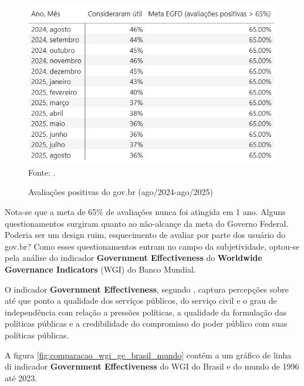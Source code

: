 \begin{figure}[H]
	\centering
	\caption{Avaliações positivas do gov.br (ago/2024-ago/2025)}
	\includegraphics[width=1\linewidth]{figuras/avaliacoes_poitivas_govbr}
	\label{fig:avaliacoes_poitivas_govbr}
	\footnotesize{Fonte: \cite{painel_completo_monitoramento_govbr}.}
\end{figure}

Nota-se que a meta de 65\% de avaliações nunca foi atingida em 1 ano. Alguns questionamentos surgiram quanto ao não-alcançe da meta do Governo Federal. Poderia ser um design ruim, esquecimento de avaliar por parte dos usuário do gov.br? Como esses questionamentos entram no campo da subjetividade, optou-se pela análise do indicador \textbf{Government Effectiveness} do \textbf{Worldwide Governance Indicators} (WGI) do Banco Mundial.

O indicador \textbf{Government Effectiveness}, segundo \cite{kaufmann2024worldwide}, captura percepções sobre até que ponto a qualidade dos serviços públicos, do serviço civil e o grau de independência com relação a pressões políticas, a qualidade da formulação das políticas públicas e a credibilidade do compromisso do poder público com suas políticas públicas.

A figura \ref{fig:comparacao_wgi_ge_brasil_mundo} contém a um gráfico de linha di indicador \textbf{Government Effectiveness} do WGI do Brasil e do mundo de 1996 até 2023.

